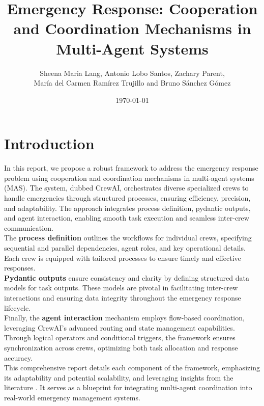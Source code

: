 \documentclass[12pt,a4paper,twocolumn]{article}
\title{Emergency Response: Cooperation and Coordination Mechanisms in Multi-Agent Systems}
\author{Sheena Maria Lang, Antonio Lobo Santos, Zachary Parent, \\ María del Carmen Ramírez Trujillo and Bruno Sánchez Gómez}
\date{\today}
\begin{document}
\maketitle
\tableofcontents
\newpage

\section{Introduction}
In this report, we propose a robust framework to address the emergency response problem using cooperation and coordination
 mechanisms in multi-agent systems (MAS). The system, dubbed CrewAI, orchestrates diverse specialized crews to handle emergencies
  through structured processes, ensuring efficiency, precision, and adaptability. The approach integrates process definition, 
  pydantic outputs, and agent interaction, enabling smooth task execution and seamless inter-crew communication.
\\

The \textbf{process definition} outlines the workflows for individual crews, specifying sequential and parallel dependencies, agent roles,
 and key operational details. Each crew is equipped with tailored processes to ensure timely and effective responses.
\\ 

\textbf{Pydantic outputs} ensure consistency and clarity by defining structured data models for task outputs. These models are
 pivotal in facilitating inter-crew interactions and ensuring data integrity throughout the emergency response lifecycle.
\\ 

Finally, the \textbf{agent interaction} mechanism employs flow-based coordination, leveraging CrewAI’s advanced routing and state 
management capabilities. Through logical operators and conditional triggers, the framework ensures synchronization across crews, 
optimizing both task allocation and response accuracy.
\\ 

This comprehensive report details each component of the framework, emphasizing its adaptability and potential scalability, and leveraging insights from the literature \cite{app10155335, 2009-weiss, 10.5555/1695886}. 
It serves as a blueprint for integrating multi-agent coordination into real-world emergency management systems.
\\
\end{document}
